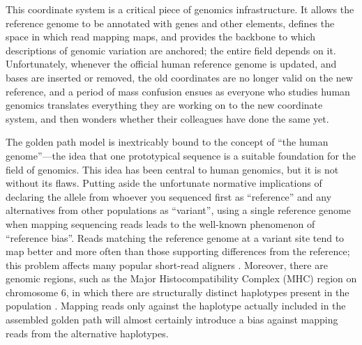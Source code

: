 \documentclass[11pt,proposal]{ucthesis}
\begin{document}
This coordinate system is a critical piece of genomics infrastructure. It allows the reference genome to be annotated with genes and other elements, defines the space in which read mapping maps, and provides the backbone to which descriptions of genomic variation are anchored; the entire field depends on it. Unfortunately, whenever the official human reference genome is updated, and bases are inserted or removed, the old coordinates are no longer valid on the new reference, and a period of mass confusion ensues as everyone who studies human genomics translates everything they are working on to the new coordinate system, and then wonders whether their colleagues have done the same yet.

The golden path model is inextricably bound to the concept of ``the human genome''---the idea that one prototypical sequence is a suitable foundation for the field of genomics. This idea has been central to human genomics, but it is not without its flaws. Putting aside the unfortunate normative implications of declaring the allele from whoever you sequenced first as ``reference'' and any alternatives from other populations as ``variant'', using a single reference genome when mapping sequencing reads leads to the well-known phenomenon of ``reference bias''. Reads matching the reference genome at a variant site tend to map better and more often than those supporting differences from the reference; this problem affects many popular short-read aligners \cite{lunter2011stampy}. Moreover, there are genomic regions, such as the Major Histocompatibility Complex (MHC) region on chromosome 6, in which there are structurally distinct haplotypes present in the population \cite{church2011modernizing}. Mapping reads only against the haplotype actually included in the assembled golden path will almost certainly introduce a bias against mapping reads from the alternative haplotypes.


     
     
     
        
     
     
\end{document}
